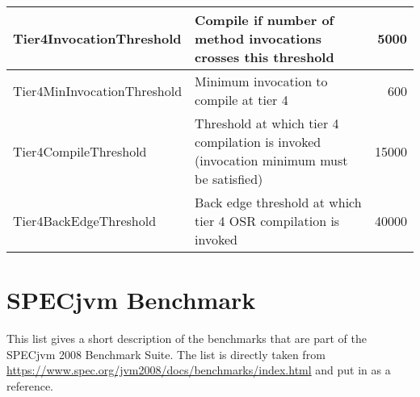\begin{table}[h]
\begin{center}
\begin{tabular}{| l | p{9.0cm} | r | }
       Tier4InvocationThreshold & Compile if number of method invocations crosses this threshold & 5000 \\ \hline
       Tier4MinInvocationThreshold & Minimum invocation to compile at tier 4 & 600 \\ \hline
       Tier4CompileThreshold & Threshold at which tier 4 compilation is invoked (invocation minimum must be satisfied) & 15000 \\ \hline
       Tier4BackEdgeThreshold & Back edge threshold at which tier 4 OSR compilation is invoked & 40000 \\ \hline
    \end{tabular}
  \end{center}
\end{table}

\section{SPECjvm Benchmark}
\label{a:specjvm_benchmark}
This list gives a short description of the benchmarks that are part of the SPECjvm 2008 Benchmark Suite.
The list is directly taken from \url{https://www.spec.org/jvm2008/docs/benchmarks/index.html} and put in as a reference.
